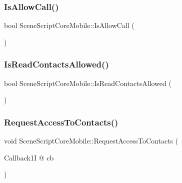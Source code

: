 \hypertarget{class_scene_script_core_mobile_a8f78dc37f8c60b266ea1a91a23243c6c}{}\label{class_scene_script_core_mobile_a8f78dc37f8c60b266ea1a91a23243c6c} 
\subsubsection{\texorpdfstring{Is\+Allow\+Call()}{IsAllowCall()}}
{\footnotesize\ttfamily bool Scene\+Script\+Core\+Mobile\+::\+Is\+Allow\+Call (\begin{DoxyParamCaption}{ }\end{DoxyParamCaption})}

\hypertarget{class_scene_script_core_mobile_a3a6620cdb6dfbe9bc34edfabde93b8ef}{}\label{class_scene_script_core_mobile_a3a6620cdb6dfbe9bc34edfabde93b8ef} 
\subsubsection{\texorpdfstring{Is\+Read\+Contacts\+Allowed()}{IsReadContactsAllowed()}}
{\footnotesize\ttfamily bool Scene\+Script\+Core\+Mobile\+::\+Is\+Read\+Contacts\+Allowed (\begin{DoxyParamCaption}{ }\end{DoxyParamCaption})}

\hypertarget{class_scene_script_core_mobile_ad48ba9c214510f891dd055cc04d3a77e}{}\label{class_scene_script_core_mobile_ad48ba9c214510f891dd055cc04d3a77e} 
\subsubsection{\texorpdfstring{Request\+Access\+To\+Contacts()}{RequestAccessToContacts()}}
{\footnotesize\ttfamily void Scene\+Script\+Core\+Mobile\+::\+Request\+Access\+To\+Contacts (\begin{DoxyParamCaption}\item[{Callback1I @}]{cb }\end{DoxyParamCaption})}

